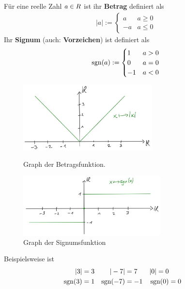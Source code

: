 \begin{defin}  
    Für eine reelle Zahl $a\in \relax R$ ist ihr \textbf{Betrag} definiert als
    \begin{align*}
        |a|:= \begin{cases}
            a&a\ge 0\\
            -a&a \le 0
        \end{cases}
    \end{align*}
    Ihr \textbf{Signum} (auch: \textbf{Vorzeichen}) ist definiert als
    \begin{align*}
        \operatorname{sgn}(a) := \begin{cases}
            1 & a>0 \\
            0 & a=0 \\
            -1 & a<0
        \end{cases}
    \end{align*} 
    \begin{figure}[ht]
    \begin{minipage}{.48\textwidth}
        \includegraphics[width=7cm]{./_img/Betrag.jpeg}
        \centering \caption{Graph der Betragsfunktion.}
    \end{minipage}
    \quad
    \begin{minipage}{.48\textwidth}
        \includegraphics[trim={0 -1.2em 0 -1.2em}, width=7.5cm]{./_img/Signum.jpeg}
        \centering \caption{Graph der Signumsfunktion}
    \end{minipage}
    \end{figure}
\end{defin}


\begin{bsp}
    Beispielsweise ist
    \begin{align*}
        \vert 3\vert &= 3 & \vert -7\vert &=7 & \vert 0\vert=0 \\
        \operatorname{sgn}(3) & = 1 & \operatorname{sgn}(-7) & = -1 & \operatorname{sgn}(0) & = 0
    \end{align*}
\end{bsp}


